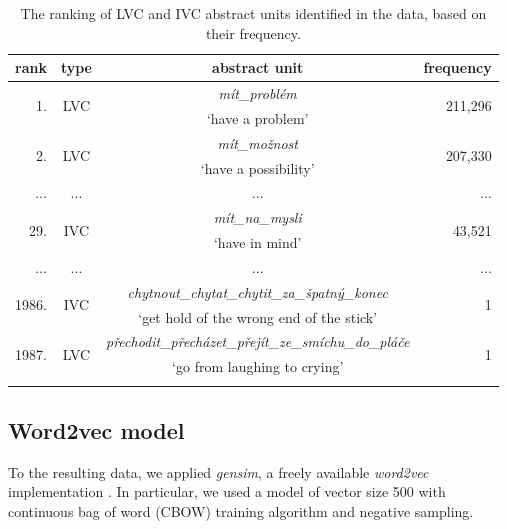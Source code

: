 \documentclass[output=paper
,modfonts
,nonflat]{langsci/langscibook}
\begin{document}
\begin{table}[tb]
	\centering
        \begin{tabular}{rccr}
        \lsptoprule  
	       rank                 & type     &  abstract unit                         & frequency       \\  \midrule
           \multirow{2}{*}{1.}  & \multirow{2}{*}{LVC}    & \textit{mít\_problém}        & \multirow{2}{*}{211,296} \\   
	                            &                           & `have a problem'           &                         \\ 
	       \multirow{2}{*}{2.}  & \multirow{2}{*}{LVC}     & \textit{mít\_možnost}        & \multirow{2}{*}{207,330} \\   
	            	             &                          & `have a possibility'        &                         \\ 
	        ...                 & ...                         & ...                      &  ... \\     	              
           \multirow{2}{*}{29.} & \multirow{2}{*}{IVC} & \textit{mít\_na\_mysli}      & \multirow{2}{*}{43,521}     \\ 
    	 	                    &                              & `have in mind'             &                          \\  
            ...                 & ...                         & ...                     &  ... \\ 
          \multirow{2}{*}{1986.} & \multirow{2}{*}{IVC} & \textit{chytnout\_chytat\_chytit\_za\_špatný\_konec} & \multirow{2}{*}{1}    \\ 
                                 &  & `get hold of the wrong end of the stick'     &  \\            	                   
    	              
	       \multirow{2}{*}{1987.} & \multirow{2}{*}{LVC} & \textit{přechodit\_přecházet\_přejít\_ze\_smíchu\_do\_pláče} & \multirow{2}{*}{1}    \\ 
           	 	                  & & `go from laughing to crying'     &  \\    \lspbottomrule       
	\end{tabular}
	\caption{The ranking of LVC and IVC abstract units identified in the data, based on their frequency.}
	\label{lvc_frequency}
\end{table}


\subsection{Word2vec model}
\label{sec:word2vec}
To the resulting data, we applied \emph{gensim}, a freely available 
\emph{word2vec} implementation \citep{rehurek_lrec}. In particular, we 
used a model of vector size 500 with continuous bag of word (CBOW) training 
algorithm and negative sampling. 
\end{document}
